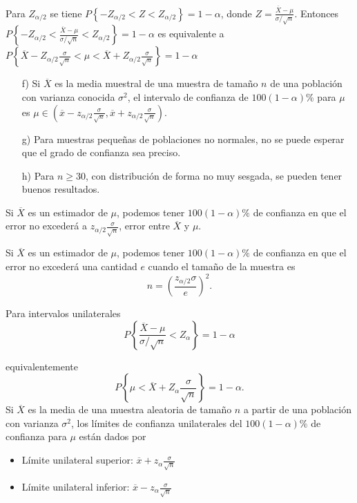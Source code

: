 Para $Z_{\alpha/2}$ se tiene $P\left\{-Z_{\alpha/2}<Z<Z_{\alpha/2}\right\}=1-\alpha$, donde $Z=\frac{\overline{X}-\mu}{\sigma/\sqrt{n}}$. Entonces
$P\left\{-Z_{\alpha/2}<\frac{\overline{X}-\mu}{\sigma/\sqrt{n}}<Z_{\alpha/2}\right\}=1-\alpha$ es equivalente a 
$P\left\{\overline{X}-Z_{\alpha/2}\frac{\sigma}{\sqrt{n}}<\mu<\overline{X}+Z_{\alpha/2}\frac{\sigma}{\sqrt{n}}\right\}=1-\alpha$ 

\begin{enumerate}
\item[f) ]Si $\overline{X}$ es la media muestral de una muestra de tama\~no $n$ de una poblaci\'on con varianza conocida $\sigma^{2}$, el intervalo de confianza de $100\left(1-\alpha\right)\%$ para $\mu$ es $\mu\in\left(\overline{x}-z_{\alpha/2}\frac{\sigma}{\sqrt{n}},\overline{x}+z_{\alpha/2}\frac{\sigma}{\sqrt{n}}\right)$.

\item[g) ] Para muestras peque\~nas de poblaciones no normales, no se puede esperar que el grado de confianza sea preciso.
\item[h) ] Para $n\geq30$, con distribuci\'on de forma no muy sesgada, se pueden tener buenos resultados.
\end{enumerate}








\begin{Teo}
Si $\overline{X}$ es un estimador de $\mu$, podemos tener $100\left(1-\alpha\right)\%$  de confianza en que el error no exceder\'a a $z_{\alpha/2}\frac{\sigma}{\sqrt{n}}$, error entre $\overline{X}$ y $\mu$.
\end{Teo}

\begin{Teo}
Si $\overline{X}$ es un estimador de $\mu$, podemos tener $100\left(1-\alpha\right)\%$  de confianza en que el error no exceder\'a una cantidad $e$ cuando el tama\~no de la muestra es $$n=\left(\frac{z_{\alpha/2}\sigma}{e}\right)^{2}.$$
\end{Teo}
\begin{Note}
Para intervalos unilaterales
$$P\left\{\frac{\overline{X}-\mu}{\sigma/\sqrt{n}}<Z_{\alpha}\right\}=1-\alpha$$
\end{Note}








equivalentemente
$$P\left\{\mu<\overline{X}+Z_{\alpha}\frac{\sigma}{\sqrt{n}}\right\}=1-\alpha.$$
Si $\overline{X}$ es la media de una muestra aleatoria de tama\~no $n$  a partir de una poblaci\'on con varianza $\sigma^{2}$, los l\'imites de confianza unilaterales del   $100\left(1-\alpha\right)\%$  de confianza para $\mu$ est\'an dados por
\begin{itemize}
\item L\'imite unilateral superior: $\overline{x}+z_{\alpha}\frac{\sigma}{\sqrt{n}}$
\item L\'imite unilateral inferior: $\overline{x}-z_{\alpha}\frac{\sigma}{\sqrt{n}}$
\end{itemize}


